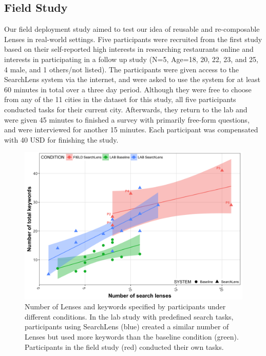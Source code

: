 \documentclass{sigchi}
\begin{document}
\subsection{Field Study}

Our field deployment study aimed to test our idea of reusable and re-composable Lenses in real-world settings. Five participants were recruited from the first study based on their self-reported high interests in researching restaurants online and interests in participating in a follow up study (N=5, Age=18, 20, 22, 23, and 25, 4 male, and 1 others/not listed). The participants were given access to the SearchLens system via the internet, and were asked to use the system for at least 60 minutes in total over a three day period. Although they were free to choose from any of the 11 cities in the dataset for this study, all five participants conducted tasks for their current city.
Afterwards, they return to the lab and were given 45 minutes to finished a survey with primarily free-form questions, and were interviewed for another 15 minutes. Each participant was compensated with 40 USD for finishing the study.

\begin{figure}[]
    \centering
    \includegraphics[width=1.0\columnwidth]{figures/LensKeywordsCount.png}
    \caption{Number of Lenses and keywords specified by participants under different conditions. In the lab study with predefined search tasks, participants using SearchLens (blue) created a similar number of Lenses but used more keywords than the baseline condition (green). Participants in the field study (red) conducted their own tasks.}
    \label{fig:counts}
\end{figure} 
\end{document}
